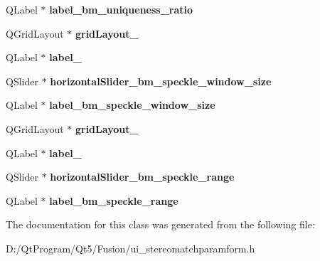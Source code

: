 \begin{DoxyCompactItemize}
\item 
\hypertarget{class_ui__stereo_match_param_form_a878dd579dea03d6ce1c69707a4ee1c44}{}Q\+Label $\ast$ {\bfseries label\+\_\+bm\+\_\+uniqueness\+\_\+ratio}\label{class_ui__stereo_match_param_form_a878dd579dea03d6ce1c69707a4ee1c44}

\item 
\hypertarget{class_ui__stereo_match_param_form_a0d3345c5c49057b521e7ba78a2422455}{}Q\+Grid\+Layout $\ast$ {\bfseries grid\+Layout\+\_}\label{class_ui__stereo_match_param_form_a0d3345c5c49057b521e7ba78a2422455}

\item 
\hypertarget{class_ui__stereo_match_param_form_a904db566b073735699e180a8b9ac6cf3}{}Q\+Label $\ast$ {\bfseries label\+\_}\label{class_ui__stereo_match_param_form_a904db566b073735699e180a8b9ac6cf3}

\item 
\hypertarget{class_ui__stereo_match_param_form_a2712b916c40c02cb3d5dac0f8b635374}{}Q\+Slider $\ast$ {\bfseries horizontal\+Slider\+\_\+bm\+\_\+speckle\+\_\+window\+\_\+size}\label{class_ui__stereo_match_param_form_a2712b916c40c02cb3d5dac0f8b635374}

\item 
\hypertarget{class_ui__stereo_match_param_form_a3f037e43c72f95327ed1594678343eec}{}Q\+Label $\ast$ {\bfseries label\+\_\+bm\+\_\+speckle\+\_\+window\+\_\+size}\label{class_ui__stereo_match_param_form_a3f037e43c72f95327ed1594678343eec}

\item 
\hypertarget{class_ui__stereo_match_param_form_a958e43f0bd113df2ef98cdd4e90f463f}{}Q\+Grid\+Layout $\ast$ {\bfseries grid\+Layout\+\_}\label{class_ui__stereo_match_param_form_a958e43f0bd113df2ef98cdd4e90f463f}

\item 
\hypertarget{class_ui__stereo_match_param_form_ab927e07729e6abaae861aacb9ffa3e25}{}Q\+Label $\ast$ {\bfseries label\+\_}\label{class_ui__stereo_match_param_form_ab927e07729e6abaae861aacb9ffa3e25}

\item 
\hypertarget{class_ui__stereo_match_param_form_aaeb747da528e94b0661f720480a3f784}{}Q\+Slider $\ast$ {\bfseries horizontal\+Slider\+\_\+bm\+\_\+speckle\+\_\+range}\label{class_ui__stereo_match_param_form_aaeb747da528e94b0661f720480a3f784}

\item 
\hypertarget{class_ui__stereo_match_param_form_a7e6e4dd880bd0797b26a721853b35425}{}Q\+Label $\ast$ {\bfseries label\+\_\+bm\+\_\+speckle\+\_\+range}\label{class_ui__stereo_match_param_form_a7e6e4dd880bd0797b26a721853b35425}

\end{DoxyCompactItemize}


The documentation for this class was generated from the following file\+:\begin{DoxyCompactItemize}
\item 
D\+:/\+Qt\+Program/\+Qt5/\+Fusion/ui\+\_\+stereomatchparamform.\+h\end{DoxyCompactItemize}
